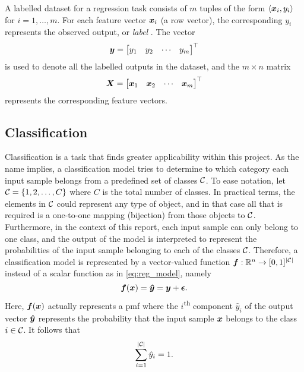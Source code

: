 \documentclass[../report.tex]{subfiles}
\begin{document}
A labelled dataset for a regression task consists of $m$ tuples of the form
$\langle {\bm{x}}_i, y_i\rangle$
for $i=1,\dots,m$.
For each feature vector ${\bm{x}}_i$ (a row vector), the corresponding $y_i$ represents the observed output, or \emph{label} \cite{burkov2019}.
The vector
\begin{equation}
    \label{eq:sup_learn_target}
    {\bm{y}} = \begin{bmatrix}
        y_1 & y_2 & \cdots & y_m
    \end{bmatrix}^\top
\end{equation}
is used to denote all the labelled outputs in the dataset, and the $m \times n$ matrix
\begin{equation}
    \label{eq:sup_learn_input_matrix}
    {\bm{X}} = \begin{bmatrix}
        {\bm{x}}_1 & {\bm{x}}_2 & \cdots & {\bm{x}}_m
    \end{bmatrix}^\top
\end{equation}
represents the corresponding feature vectors.

\subsection{Classification}
\label{sec:background_classification}
Classification is a task that finds greater applicability within this project.
As the name implies, a classification model tries to determine to which category each input sample belongs from a predefined set of classes ${\mathcal{C}}$.
To ease notation, let ${\mathcal{C}}=\{1, 2, \dots, C\}$ where $C$ is the total number of classes.
In practical terms, the elements in ${\mathcal{C}}$ could represent any type of object, and in that case all that is required is a one-to-one mapping (bijection) from those objects to ${\mathcal{C}}$.
Furthermore, in the context of this report, each input sample can only belong to one class, and the output of the model is interpreted to represent the probabilities of the input sample belonging to each of the classes ${\mathcal{C}}$.
Therefore, a classification model is represented by a vector-valued function
${\bm{f}} : \mathbb{R}^n \rightarrow [0,1]^{\lvert{\mathcal{C}}\rvert}$
instead of a scalar function as in \cref{eq:reg_model}, namely
\begin{equation}
    \label{eq:cla_model}
    {\bm{f}}({\bm{x}}) = {\bm{\hat{y}}} = {\bm{y}} + \bm{\epsilon}.
\end{equation}
Here, ${\bm{f}}({\bm{x}})$ actually represents a \gls{pmf} where the $i$\textsuperscript{th} component $\hat{y}_i$ of the output vector ${\bm{\hat{y}}}$ represents the probability that the input sample ${\bm{x}}$ belongs to the class $i\in {\mathcal{C}}$.
It follows that
\begin{equation}
    \label{eq:pmf}
    \sum_{i=1}^{\lvert{\mathcal{C}}\rvert} \hat{y}_i = 1.
\end{equation}
\end{document}

